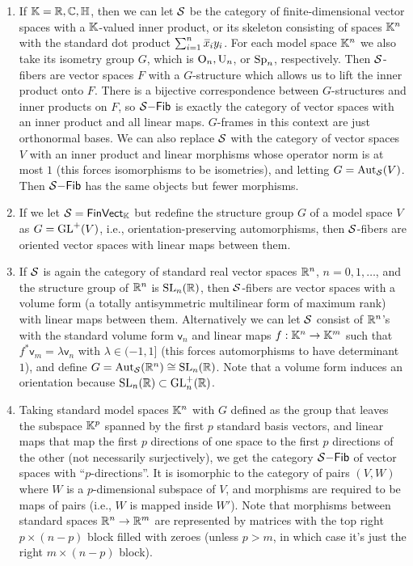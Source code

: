 \begin{example}
\begin{enumerate}
        \item If $\mathbb{K}=\mathbb{R},\mathbb{C},\mathbb{H}$, then we can let $\mathcal{S}$ be the category of finite-dimensional vector spaces with a $\mathbb{K}$-valued inner product, or its skeleton consisting of spaces $\mathbb{K}^n$ with the standard dot product $\sum_{i=1}^n \wb{x}_i y_i$. For each model space $\mathbb{K}^n$ we also take its isometry group $G$, which is $\operatorname{O}_n,\operatorname{U}_n$, or $\operatorname{Sp}_n$, respectively. Then $\mathcal{S}$-fibers are vector spaces $F$ with a $G$-structure which allows us to lift the inner product onto $F$. There is a bijective correspondence between $G$-structures and inner products on $F$, so  $\mathcal{S}\mathsf{-Fib}$ is exactly the category of vector spaces with an inner product and all linear maps. $G$-frames in this context are just orthonormal bases. We can also replace $\mathcal{S}$ with the category of vector spaces $V$ with an inner product and linear morphisms whose operator norm is at most $1$ (this forces isomorphisms to be isometries), and letting $G=\operatorname{Aut}_{\mathcal{S}}(V)$. Then $\mathcal{S}\mathsf{-Fib}$ has the same objects but fewer morphisms.

        \item If we let $\mathcal{S}=\mathsf{FinVect}_{\mathbb{K}}$ but redefine the structure group $G$ of a model space $V$ as $G=\operatorname{GL}^+(V)$, i.e., orientation-preserving automorphisms, then $\mathcal{S}$-fibers are oriented vector spaces with linear maps between them. 

        \item If $\mathcal{S}$ is again the category of standard real vector spaces $\mathbb{R}^n$, $n=0,1,\ldots$, and the structure group of $\mathbb{R}^n$ is $\operatorname{SL}_n(\mathbb{R})$, then $\mathcal{S}$-fibers are vector spaces with a volume form (a totally antisymmetric multilinear form of maximum rank) with linear maps between them. Alternatively we can let $\mathcal{S}$ consist of $\mathbb{R}^n$'s with the standard volume form $\mathsf{v}_n$ and linear maps $f:\mathbb{K}^n\to \mathbb{K}^m$ such that $f^\ast \mathsf{v}_m=\lambda \mathsf{v}_n$ with $\lambda\in (-1,1]$ (this forces automorphisms to have determinant $1$), and define $G=\operatorname{Aut}_{\mathcal{S}}(\mathbb{R}^n)\cong \operatorname{SL}_n(\mathbb{R})$. Note that a volume form induces an orientation because $\operatorname{SL}_n(\mathbb{R})\subset \operatorname{GL}_n^+(\mathbb{R})$.

        \item Taking standard model spaces $\mathbb{K}^n$ with $G$ defined as the group that leaves the subspace $\mathbb{K}^p$ spanned by the first $p$ standard basis vectors, and linear maps that map the first $p$ directions of one space to the first $p$ directions of the other (not necessarily surjectively), we get the category $\mathcal{S}\mathsf{-Fib}$ of vector spaces with ``$p$-directions''. It is isomorphic to the category of pairs $(V,W)$ where $W$ is a $p$-dimensional subspace of $V$, and morphisms are required to be maps of pairs (i.e., $W$ is mapped inside $W'$). Note that morphisms between standard spaces $\mathbb{R}^n\to \mathbb{R}^m$ are represented by matrices with the top right $p\times(n-p)$ block filled with zeroes (unless $p>m$, in which case it's just the right $m\times (n-p)$ block).


\end{enumerate}
\end{example}
